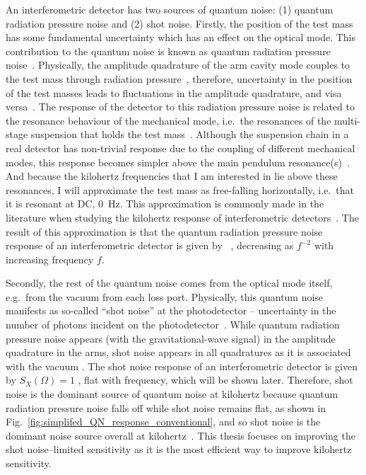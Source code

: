 An interferometric detector has two sources of quantum noise: (1) quantum radiation pressure noise and (2) shot noise. 
Firstly, the position of the test mass has some fundamental uncertainty which has an effect on the optical mode. %
This contribution to the quantum noise is known as quantum radiation pressure noise~\cite{}. 
Physically, the amplitude quadrature of the arm cavity mode couples to the test mass through radiation pressure~\cite{}, therefore, uncertainty in the position of the test masses leads to fluctuations in the amplitude quadrature, and visa versa~\cite{Danilishin?}. The response of the detector to this radiation pressure noise is related to the resonance behaviour of the mechanical mode, i.e.\ the resonances of the multi-stage suspension that holds the test mass~\cite{}. Although the suspension chain in a real detector has non-trivial response due to the coupling of different mechanical modes, this response becomes simpler above the main pendulum resonance(s)~\cite{}. And because the kilohertz frequencies that I am interested in lie above these resonances, I will approximate the test mass as free-falling horizontally, i.e.\ that it is resonant at DC, $0$~Hz. This approximation is commonly made in the literature when studying the kilohertz response of interferometric detectors~\cite{}. The result of this approximation is that the quantum radiation pressure noise response of an interferometric detector is given by ~\cite{}, decreasing as $f^{-2}$ with increasing frequency $f$.

Secondly, the rest of the quantum noise comes from the optical mode itself, e.g.\ from the vacuum from each loss port. Physically, this quantum noise manifests as so-called ``shot noise'' at the photodetector -- uncertainty in the number of photons incident on the photodetector~\cite{}. While quantum radiation pressure noise appears (with the gravitational-wave signal) in the amplitude quadrature in the arms, shot noise appears in all quadratures as it is associated with the vacuum . The shot noise response of an interferometric detector is given by $S_X(\Omega) = 1$ , flat with frequency, which will be shown later. Therefore, shot noise is the dominant source of quantum noise at kilohertz because quantum radiation pressure noise falls off while shot noise remains flat, as shown in Fig.~\ref{fig:simplifed_QN_response_conventional}, and so shot noise is the dominant noise source overall at kilohertz~\cite{}. This thesis focuses on improving the shot noise--limited sensitivity as it is the most efficient way to improve kilohertz sensitivity. 


